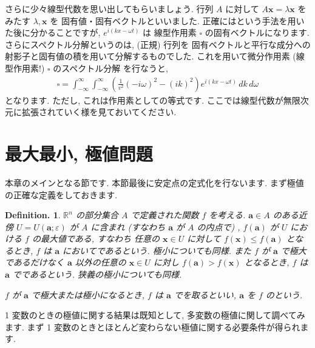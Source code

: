 \documentclass[openany, a4paper, oneside]{jsbook}
\theoremstyle{break}
\theoremstyle{breakdefn}
\newtheorem{defn}[thm]{Definition.}
\newcommand{\bbR}{\mathbb{R}}
\newcommand{\vep}{\varepsilon}
\begin{document}
さらに少々線型代数を思い出してもらいましょう. 行列 $A$ に対して $A\bm{x}=\lambda \bm{x}$ をみたす $\lambda , \bm{x}$ を
固有値・固有ベクトルといいました.
正確にはという手法を用いた後に分かることですが,  $e^{i (kx-\omega t)}$ は
線型作用素 $\square$ の固有ベクトルになります.
さらにスペクトル分解というのは, (正規) 行列を
固有ベクトルと平行な成分への射影子と固有値の積を用いて分解するものでした.
これを用いて微分作用素 (線型作用素!) $\square$ のスペクトル分解 を行なうと,
\begin{align}
\square
=
\int _{-\infty} ^{\infty}\int _{-\infty} ^{\infty}
\left (
\frac{1} {v^2} (-i\omega )^2 - (i k) ^2
\right)
e^{i (k x - \omega t)} \, d k \, d\omega
\end{align}
となります. ただし, これは作用素としての等式です.
ここでは線型代数が無限次元に拡張されていく様を見ておいてください.
\section{最大最小, 極値問題}


本章のメインとなる節です.
本節最後に安定点の定式化を行ないます.
まず極値の正確な定義をしておきます.
\begin{defn}
$\bbR^n$ の部分集合 $A$ で定義された関数 $f$ を考える.
$\bm{a}\in A$
のある近傍 $U=U (\bm{a}; \vep)$ が $A$ に含まれ (すなわち $\bm{a}$ が $A$ の内点で) ,
$f (\bm{a})$ が $U$ における $f$ の最大値である, すなわち
任意の $\bm{x}\in U$ に対して $f (\bm{x}) \leq f (\bm{a})$ となるとき,
$f$ は $\bm{a}$ においてであるという.
極小についても同様.
また $f$ が $\bm{a}$ で極大であるだけなく
$\bm{a}$ 以外の任意の $\bm{x} \in U$ に対し $f (\bm{a}) > f ( \bm{x} )$ となるとき,
$f$ は $\bm{a}$ でであるという.
狭義の極小についても同様.

$f$ が $\bm{a}$ で極大または極小になるとき,  $f$ は $\bm{a}$ でを取るといい,
$\bm{a}$ を $f$ のという.
\end{defn}
1 変数のときの極値に関する結果は既知として, 多変数の極値に関して調べてみます.
まず 1 変数のときとほとんど変わらない極値に関する必要条件が得られます.
\end{document}

